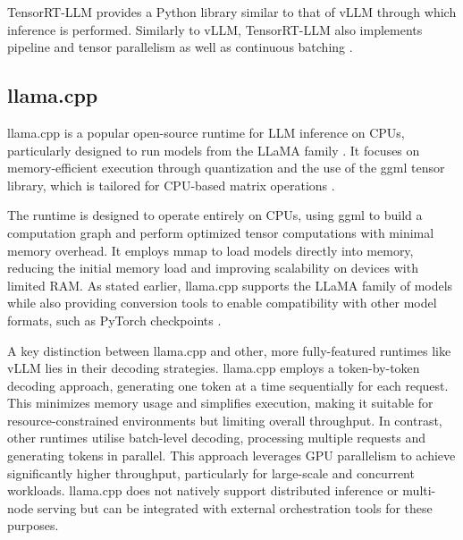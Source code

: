 \documentclass[11pt,twoside]{report}
\begin{document}
TensorRT-LLM provides a Python library similar to that of vLLM through which inference is performed.
Similarly to vLLM, TensorRT-LLM also implements pipeline and tensor parallelism as well as continuous batching \cite{nvidiainferencewhitepaper}.

\subsection{llama.cpp}\label{subsection:llama.cpp}

llama.cpp is a popular open-source runtime for LLM inference on CPUs, particularly designed to run models from the LLaMA family \cite{touvron2023llama}. 
It focuses on memory-efficient execution through quantization and the use of the ggml tensor library, which is tailored for CPU-based matrix operations \cite{ggml}.

The runtime is designed to operate entirely on CPUs, using ggml to build a computation graph and perform optimized tensor computations with minimal memory overhead. 
It employs mmap to load models directly into memory, reducing the initial memory load and improving scalability on devices with limited RAM. 
As stated earlier, llama.cpp supports the LLaMA family of models while also providing conversion tools to enable compatibility with other model formats, such as PyTorch checkpoints \cite{paszke2019pytorch}.

A key distinction between llama.cpp and other, more fully-featured runtimes like vLLM lies in their decoding strategies. 
llama.cpp employs a token-by-token decoding approach, generating one token at a time sequentially for each request. 
This minimizes memory usage and simplifies execution, making it suitable for resource-constrained environments but limiting overall throughput.
In contrast, other runtimes utilise batch-level decoding, processing multiple requests and generating tokens in parallel.
This approach leverages GPU parallelism to achieve significantly higher throughput, particularly for large-scale and concurrent workloads.
llama.cpp does not natively support distributed inference or multi-node serving but can be integrated with external orchestration tools \cite{ray} for these purposes.
\end{document}
